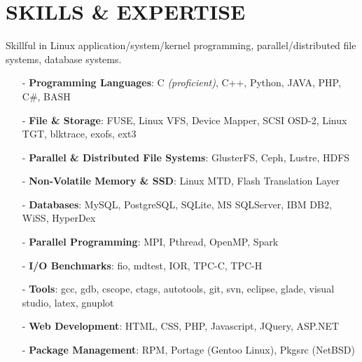 \section{SKILLS \& EXPERTISE}
Skillful in Linux application/system/kernel programming, parallel/distributed file systems, database systems.
\begin{itemize}[leftmargin=*]
\setlength\itemsep{-0.02in}
\item[-] {\bf Programming Languages}: C {\footnotesize \it (proficient)}, C++,
         Python, JAVA, PHP, C\#, BASH
\item[-] {\bf File \& Storage}: FUSE, Linux VFS, Device Mapper, SCSI OSD-2, Linux TGT, blktrace, exofs, ext3
\item[-] {\bf Parallel \& Distributed File Systems}: GlusterFS, Ceph, Lustre, HDFS
\item[-] {\bf Non-Volatile Memory \& SSD}: Linux MTD, Flash Translation Layer
\item[-] {\bf Databases}: MySQL, PostgreSQL, SQLite, MS SQLServer, IBM DB2, WiSS, HyperDex
\item[-] {\bf Parallel Programming}: MPI, Pthread, OpenMP, Spark
\item[-] {\bf I/O Benchmarks}: fio, mdtest, IOR, TPC-C, TPC-H
\item[-] {\bf Tools}: gcc, gdb, cscope, ctags, autotools, git, svn, eclipse, glade, visual studio, latex, gnuplot
\item[-] {\bf Web Development}: HTML, CSS, PHP, Javascript, JQuery, ASP.NET
\item[-] {\bf Package Management}: RPM, Portage (Gentoo Linux), Pkgsrc (NetBSD)
\end{itemize}

